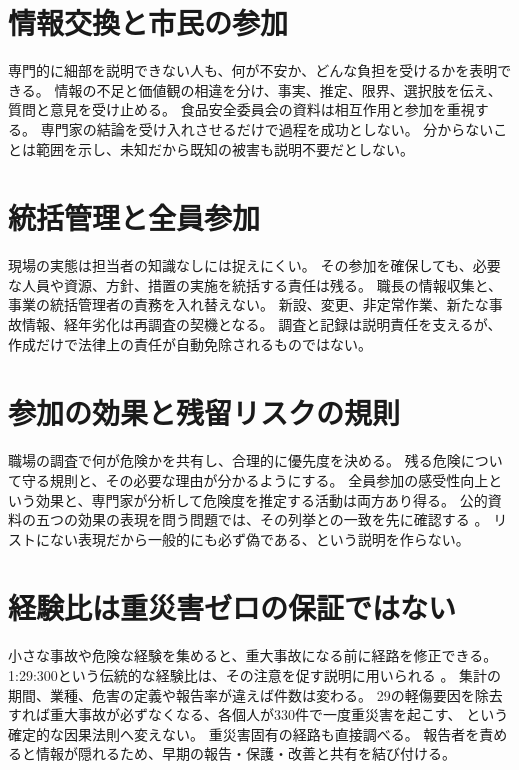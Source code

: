 \section{情報交換と市民の参加}
\label{theory:safety:communication}
専門的に細部を説明できない人も、何が不安か、どんな負担を受けるかを表明できる。
情報の不足と価値観の相違を分け、事実、推定、限界、選択肢を伝え、
質問と意見を受け止める。
食品安全委員会の資料は相互作用と参加を重視する\cite{saf_fsc_psych,saf_fsc_glossary}。
専門家の結論を受け入れさせるだけで過程を成功としない。
分からないことは範囲を示し、未知だから既知の被害も説明不要だとしない。

\section{統括管理と全員参加}
\label{theory:safety:governance}
現場の実態は担当者の知識なしには捉えにくい。
その参加を確保しても、必要な人員や資源、方針、措置の実施を統括する責任は残る。
職長の情報収集と、事業の統括管理者の責務を入れ替えない。
新設、変更、非定常作業、新たな事故情報、経年劣化は再調査の契機となる。
調査と記録は説明責任を支えるが、作成だけで法律上の責任が自動免除されるものではない。

\section{参加の効果と残留リスクの規則}
\label{theory:safety:participation}
職場の調査で何が危険かを共有し、合理的に優先度を決める。
残る危険について守る規則と、その必要な理由が分かるようにする。
全員参加の感受性向上という効果と、専門家が分析して危険度を推定する活動は両方あり得る。
公的資料の五つの効果の表現を問う問題では、その列挙との一致を先に確認する
\cite{saf_ra_effects}。
リストにない表現だから一般的にも必ず偽である、という説明を作らない。

\section{経験比は重災害ゼロの保証ではない}
\label{theory:safety:incident}
小さな事故や危険な経験を集めると、重大事故になる前に経路を修正できる。
1:29:300という伝統的な経験比は、その注意を促す説明に用いられる
\cite{saf_welfare}。
集計の期間、業種、危害の定義や報告率が違えば件数は変わる。
29の軽傷要因を除去すれば重大事故が必ずなくなる、各個人が330件で一度重災害を起こす、
という確定的な因果法則へ変えない。
重災害固有の経路も直接調べる。
報告者を責めると情報が隠れるため、早期の報告・保護・改善と共有を結び付ける。

